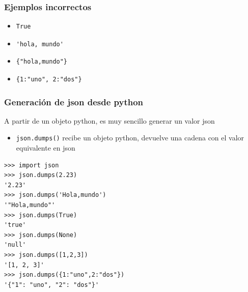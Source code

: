 \documentclass[ucs]{beamer}
\begin{document}
\begin{frame}[fragile]
\frametitle{Ejemplos incorrectos}
\begin{itemize}
\item
  \begin{footnotesize}
  \begin{verbatim}
True
  \end{verbatim}
  \end{footnotesize}

\item

  \begin{footnotesize}
  \begin{verbatim}
'hola, mundo'
  \end{verbatim}
  \end{footnotesize}

\item
  \begin{footnotesize}
  \begin{verbatim}
{"hola,mundo"}
  \end{verbatim}
  \end{footnotesize}

\item
  \begin{footnotesize}
  \begin{verbatim}
{1:"uno", 2:"dos"}
  \end{verbatim}
  \end{footnotesize}
\end{itemize}

\end{frame}



\begin{frame}[fragile]
\frametitle{Generación de json desde python}
A partir de un objeto python, es muy sencillo generar un valor json
\begin{itemize}
\item
\verb|json.dumps()| recibe un objeto python, devuelve una cadena con el valor equivalente en json
\end{itemize}

  \begin{footnotesize}
  \begin{verbatim}
>>> import json
>>> json.dumps(2.23)
'2.23'
>>> json.dumps('Hola,mundo')
'"Hola,mundo"'
>>> json.dumps(True)
'true'
>>> json.dumps(None)
'null'
>>> json.dumps([1,2,3])
'[1, 2, 3]'
>>> json.dumps({1:"uno",2:"dos"})
'{"1": "uno", "2": "dos"}'
  \end{verbatim}
  \end{footnotesize}
\end{frame}
\end{document}
